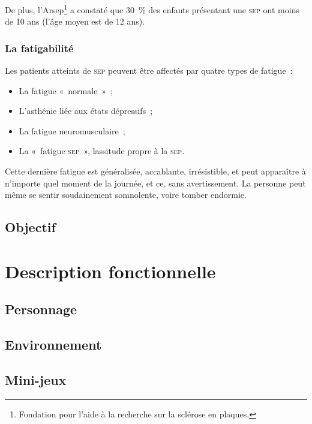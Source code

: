 \documentclass[a4paper,12pt,francais]{article}
\newcommand{\SEP}{\textsc{sep}\xspace}
\begin{document}
De plus, l’Arsep\footnote{Fondation pour l'aide à la recherche sur la sclérose en plaques.} a constaté que 30~\% des enfants présentant une \SEP{} ont moins de 10 ans (l’âge moyen est de 12 ans).

\subsubsection{La fatigabilité}

Les patients atteints de \SEP{} peuvent être affectés par quatre types de fatigue~:
\begin{itemize}
    \item La fatigue «~normale~»~;
\item L’asthénie liée aux états dépressifs~;
\item La fatigue neuromusculaire~;
\item La «~fatigue \SEP{}~», lassitude propre à la \SEP{}.
\end{itemize}

Cette dernière fatigue est généralisée, accablante, irrésistible, et peut apparaître à n’importe quel moment de la journée, et ce, sans avertissement. La personne peut même se sentir soudainement somnolente, voire tomber endormie.

\subsection{Objectif}

\section{Description fonctionnelle}

\subsection{Personnage}
\subsection{Environnement}
\subsection{Mini-jeux}
\end{document}
